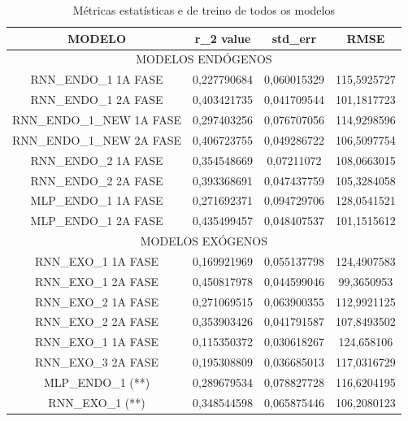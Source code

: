 \documentclass[	12pt, Times, openright, twoside, a4paper, english, brazil]{abntex2}
\begin{document}
	    
	    
	    
	    \begin{table}[!ht]
        \caption{Métricas estatísticas e de treino de todos os modelos}
        \begin{adjustbox}{width=0.8\columnwidth,center}
           \begin{tabular}{ |c | c| c | c| }
     \rowcolor{gray!50}
   {	MODELO} & r\_2 value &	std\_err & RMSE \\ \hline
     \multicolumn{4}{c}{	MODELOS ENDÓGENOS }  \\ \hline
RNN\_ENDO\_1 1A FASE&	0,227790684	&0,060015329&	115,5925727\\ \hline
RNN\_ENDO\_1 2A FASE&	0,403421735	&0,041709544&	101,1817723\\ \hline
RNN\_ENDO\_1\_NEW 1A FASE&	0,297403256&	0,076707056&	114,9298596\\ \hline
RNN\_ENDO\_1\_NEW 2A FASE&	0,406723755&	0,049286722&	106,5097754\\ \hline
RNN\_ENDO\_2 1A FASE&	0,354548669	&0,07211072&	108,0663015\\ \hline
RNN\_ENDO\_2 2A FASE&	0,393368691	&0,047437759&	105,3284058\\ \hline
MLP\_ENDO\_1 1A FASE&	0,271692371	&0,094729706&	128,0541521\\ \hline
MLP\_ENDO\_1 2A FASE&	0,435499457	&0,048407537&	101,1515612\\ \hline
	\multicolumn{4}{c}{ MODELOS EXÓGENOS }\\ \hline
RNN\_EXO\_1 1A FASE &	0,169921969	&0,055137798&	124,4907583\\ \hline
RNN\_EXO\_1 2A FASE	&0,450817978&	0,044599046	&99,3650953\\ \hline
RNN\_EXO\_2 1A FASE&	0,271069515&	0,063900355&	112,9921125\\ \hline
RNN\_EXO\_2 2A FASE&	0,353903426&	0,041791587	&107,8493502\\ \hline
RNN\_EXO\_1 1A FASE	&0,115350372&	0,030618267	&124,658106\\ \hline
RNN\_EXO\_3 2A FASE&	0,195308809	&0,036685013&	117,0316729\\ \hline
MLP\_ENDO\_1 (**)&	0,289679534	&0,078827728&	116,6204195\\ \hline
RNN\_EXO\_1  (**)&	0,348544598	&0,065875446&	106,2080123 \\ \hline
\end{tabular} \end{adjustbox} \end{table} 
	    
\end{document}
